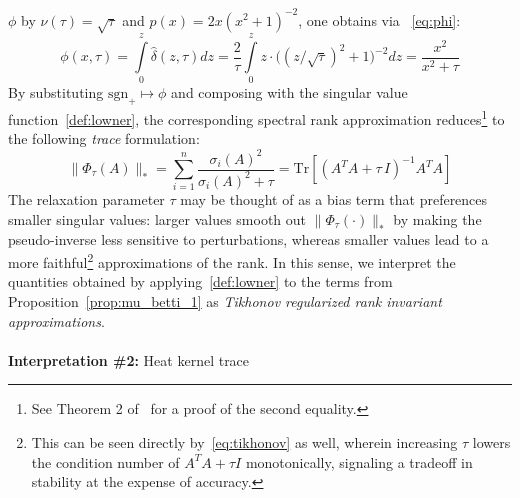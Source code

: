 \documentclass[10pt]{article}
\numberwithin{equation}{section}
\newcommand{\+}{%
	\raisebox{0.18ex}{\scaleobj{0.55}{+}}
}
\theoremstyle{definition}
\theoremstyle{definition}
\begin{document}
$\phi$ by $\nu(\tau) = \sqrt{\tau}$ and $p(x) = 2x (x^2 + 1)^{-2}$, one obtains via ~\eqref{eq:phi}:
\begin{equation}\label{eq:tikhonov_sf}
	\phi(x, \tau) = \int\limits_{0}^z \hat{\delta}(z, \tau) dz = \frac{2}{\tau}\int\limits_{0}^z z \cdot  \big((z/\sqrt{\tau})^2+1\big)^{-2} dz = \frac{x^2}{x^2 + \tau} %
\end{equation}
By substituting $\mathrm{sgn}_+ \mapsto \phi$ and composing with the singular value function~\eqref{def:lowner}, the corresponding spectral rank approximation reduces\footnote{See Theorem 2 of~\cite{zhao2012approximation} for a proof of the second equality.} to the following \emph{trace} formulation:
\begin{equation}\label{eq:tikhonov_1}
	\lVert \Phi_\tau(A) \rVert_\ast = \sum\limits_{i = 1}^n \frac{\sigma_i(A)^2}{\sigma_i(A)^2 + \tau} = \mathrm{Tr}\left[(A^T A + \tau \, I)^{-1} A^T A \right]
\end{equation}
The relaxation parameter $\tau$ may be thought of as a bias term that preferences smaller singular values: larger values smooth out $\lVert \Phi_\tau(\cdot) \rVert_\ast$ by making the pseudo-inverse less sensitive to perturbations, whereas smaller values lead to a more faithful\footnote{This can be seen directly by~\eqref{eq:tikhonov} as well, wherein increasing $\tau$ lowers the condition number of $A^T A + \tau I$ monotonically, signaling a tradeoff in stability at the expense of accuracy.} approximations of the rank.
In this sense, we interpret the quantities obtained by applying~\eqref{def:lowner} to the terms from Proposition~\ref{prop:mu_betti_1} as \emph{Tikhonov regularized rank invariant approximations}.
\\
\\
\noindent \textbf{Interpretation \#2:} Heat kernel trace
 
\end{document}
